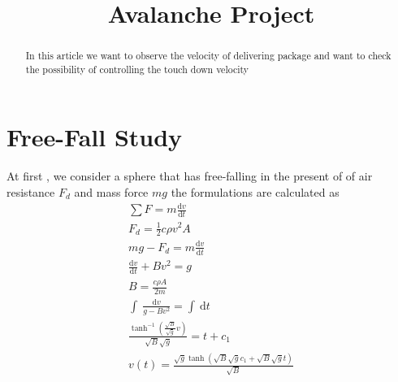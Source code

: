 \documentclass[20pt,a4paper]{article}
\title{Avalanche Project}
\begin{document}
    \maketitle

    \begin{abstract}
            In this article we want to observe the velocity of delivering package and want to check the possibility of controlling the touch down velocity
    \end{abstract}

    \section{Free-Fall Study}
    At first , we consider a sphere that has free-falling in the present of of air resistance $F_d$ and mass force $mg$
    the formulations are calculated as 
    \begin{align}
        \sum F= m\frac{\mathrm{d} v}{\mathrm{d} t} \\
         F_d = \frac{1}{2}c\rho v^2A\\ 
         mg - F_d = m\frac{\mathrm{d} v}{\mathrm{d} t}\\
         \frac{\mathrm{d} v}{\mathrm{d} t}+Bv^2=g\\
         B=\frac{c\rho A}{2m} \\
         \int_{}^{}  \,\frac{\mathrm{d}v}{g-Bv^2} =\int_{}^{}  \,\mathrm{d}t\\ 
         \frac{\tanh ^{-1}(\frac{\sqrt{B}}{\sqrt{g}}v )}{\sqrt{B}\sqrt{g}}=t+c_1\\
         v(t)=\frac{\sqrt{g}\tanh (\sqrt{B}\sqrt{g} c_1+\sqrt{B}\sqrt{g}t)}{\sqrt{B}}  
    \end{align}
\end{document}
